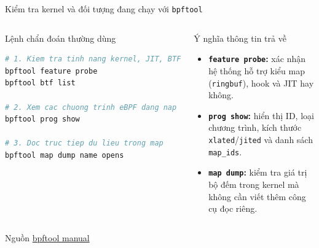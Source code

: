 \begin{frame}[fragile]{Kiểm tra kernel và đối tượng đang chạy với \texttt{bpftool}}
  \begin{columns}[T,onlytextwidth]
    \begin{block}{Lệnh chẩn đoán thường dùng}
\begin{lstlisting}[language=bash,style=dense]
# 1. Kiem tra tinh nang kernel, JIT, BTF
bpftool feature probe
bpftool btf list

# 2. Xem cac chuong trinh eBPF dang nap
bpftool prog show

# 3. Doc truc tiep du lieu trong map
bpftool map dump name opens
\end{lstlisting}
    \end{block}

    \begin{block}{Ý nghĩa thông tin trả về}
      \small
      \begin{itemize}
        \item \textbf{\texttt{feature probe}:} xác nhận hệ thống hỗ trợ kiểu map (\texttt{ringbuf}), hook và JIT hay không.
        \item \textbf{\texttt{prog show}:} hiển thị ID, loại chương trình, kích thước \texttt{xlated}/\texttt{jited} và danh sách \texttt{map\_ids}.
        \item \textbf{\texttt{map dump}:} kiểm tra giá trị bộ đếm trong kernel mà không cần viết thêm công cụ đọc riêng.
      \end{itemize}
    \end{block}
  \end{columns}
  \medskip
  {\scriptsize Nguồn \href{https://github.com/libbpf/bpftool/blob/main/docs/bpftool.rst}{bpftool manual}}
\end{frame}

